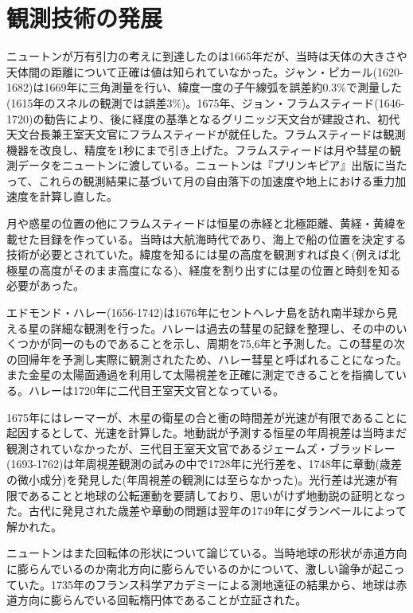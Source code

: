 \section{観測技術の発展}
	ニュートンが万有引力の考えに到達したのは1665年だが、当時は天体の大きさや天体間の距離について正確は値は知られていなかった。ジャン・ピカール(1620-1682)は1669年に三角測量を行い、緯度一度の子午線弧を誤差約0.3\%で測量した(1615年のスネルの観測では誤差3\%)。1675年、ジョン・フラムスティード(1646-1720)の勧告により、後に経度の基準となるグリニッジ天文台が建設され、初代天文台長兼王室天文官にフラムスティードが就任した。フラムスティードは観測機器を改良し、精度を1秒にまで引き上げた。フラムスティードは月や彗星の観測データをニュートンに渡している。ニュートンは『プリンキピア』出版に当たって、これらの観測結果に基づいて月の自由落下の加速度や地上における重力加速度を計算し直した。
    
    月や惑星の位置の他にフラムスティードは恒星の赤経と北極距離、黄経・黄緯を載せた目録を作っている。当時は大航海時代であり、海上で船の位置を決定する技術が必要とされていた。緯度を知るには星の高度を観測すれば良く(例えば北極星の高度がそのまま高度になる)、経度を割り出すには星の位置と時刻を知る必要があった。
    
	エドモンド・ハレー(1656-1742)は1676年にセントヘレナ島を訪れ南半球から見える星の詳細な観測を行った。ハレーは過去の彗星の記録を整理し、その中のいくつかが同一のものであることを示し、周期を75,6年と予測した。この彗星の次の回帰年を予測し実際に観測されたため、ハレー彗星と呼ばれることになった。また金星の太陽面通過を利用して太陽視差を正確に測定できることを指摘している。ハレーは1720年に二代目王室天文官となっている。
    
	1675年にはレーマーが、木星の衛星の合と衝の時間差が光速が有限であることに起因するとして、光速を計算した。地動説が予測する恒星の年周視差は当時まだ観測されていなかったが、三代目王室天文官であるジェームズ・ブラッドレー(1693-1762)は年周視差観測の試みの中で1728年に光行差を、1748年に章動(歳差の微小成分)を発見した(年周視差の観測には至らなかった)。光行差は光速が有限であることと地球の公転運動を要請しており、思いがけず地動説の証明となった。古代に発見された歳差や章動の問題は翌年の1749年にダランベールによって解かれた。
    
	ニュートンはまた回転体の形状について論じている。当時地球の形状が赤道方向に膨らんでいるのか南北方向に膨らんでいるのかについて、激しい論争が起こっていた。1735年のフランス科学アカデミーによる測地遠征の結果から、地球は赤道方向に膨らんでいる回転楕円体であることが立証された。


